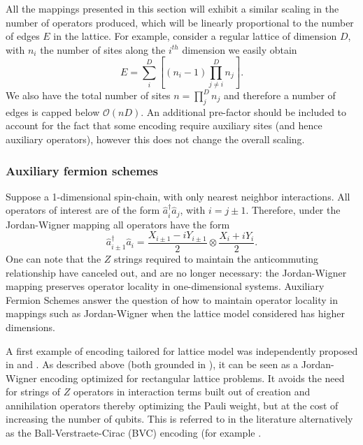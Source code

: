 All the mappings presented in this section will exhibit a similar scaling in the number of operators produced, which will be linearly proportional to the number of edges $E$ in the lattice. For example, consider a regular lattice of dimension $D$, with $n_i$ the number of sites along the $i^{th}$ dimension we easily obtain
\begin{equation}
    E = \sum_i^D \left[ (n_i - 1) \prod_{j \neq i}^D n_j \right].
\end{equation}
We also have the total number of sites $n = \prod_{j}^D n_j$ and therefore a number of edges is capped below $\mathcal{O}(nD)$. An additional pre-factor should be included to account for the fact that some encoding require auxiliary sites (and hence auxiliary operators), however this does not change the overall scaling.


\subsubsection{Auxiliary fermion schemes}

Suppose a 1-dimensional spin-chain, with only nearest neighbor interactions. All operators of interest are of the form $\hat{a}_i^{\dagger}\hat{a}_j$, with $i = j \pm 1$. Therefore, under the Jordan-Wigner mapping all operators have the form
\begin{equation} \label{eq:hopping}
\hat{a}_{i \pm 1}^{\dagger} \hat{a}_{i}=\frac{X_{i \pm 1}-i Y_{i \pm 1}}{2} \otimes \frac{X_{i}+i Y_{i}}{2}.
\end{equation}
One can note that the $Z$ strings required to maintain the anticommuting relationship have canceled out, and are no longer necessary: the Jordan-Wigner mapping preserves operator locality in one-dimensional systems. Auxiliary Fermion Schemes answer the question of how to maintain operator locality in mappings such as Jordan-Wigner when the lattice model considered has higher dimensions.  

A first example of encoding tailored for lattice model was independently proposed in \cite{Verstraete2005} and \cite{Ball2005}. As described above (both grounded in \cite{Levin2003, Wen2003}), it can be seen as a Jordan-Wigner encoding optimized for rectangular lattice problems. It avoids the need for strings of $Z$ operators in interaction terms built out of creation and annihilation operators thereby optimizing the Pauli weight, but at the cost of increasing the number of qubits. This is referred to in the literature alternatively as the Ball-Verstraete-Cirac (BVC) encoding (for example \cite{Whitfield2016}.

